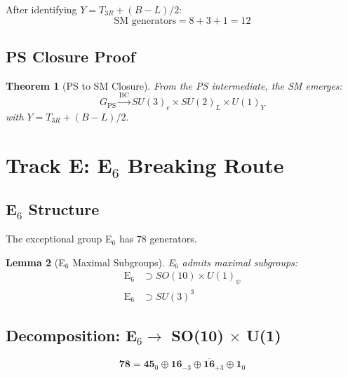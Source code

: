 \documentclass[11pt,a4paper]{article}
\newtheorem{theorem}{Theorem}[section]
\newtheorem{lemma}[theorem]{Lemma}
\begin{document}
After identifying $Y = T_{3R} + (B-L)/2$:
\begin{equation}
  \text{SM generators} = 8 + 3 + 1 = 12
  \label{eq:ps-sm-count}
\end{equation}

\subsection{PS Closure Proof}

\begin{theorem}[PS to SM Closure]
\label{thm:ps-closure}
From the PS intermediate, the SM emerges:
\begin{equation}
  G_{\text{PS}} \xrightarrow{\text{BC}} SU(3)_c \times SU(2)_L \times U(1)_Y
  \label{eq:ps-to-sm}
\end{equation}
with $Y = T_{3R} + (B-L)/2$.
\end{theorem}

\section{Track E: E$_6$ Breaking Route}
\label{sec:track-e}

\subsection{E$_6$ Structure}

The exceptional group E$_6$ has $78$ generators.

\begin{lemma}[E$_6$ Maximal Subgroups]
\label{lem:e6-subgroups}
E$_6$ admits maximal subgroups:
\begin{align}
  \text{E}_6 &\supset SO(10) \times U(1)_\psi
  \label{eq:e6-so10} \\
  \text{E}_6 &\supset SU(3)^3
  \label{eq:e6-su3cubed}
\end{align}
\end{lemma}

\subsection{Decomposition: E$_6 \to$ SO(10) $\times$ U(1)}

\begin{equation}
  \mathbf{78} = \mathbf{45}_0 \oplus \mathbf{16}_{-3} \oplus \mathbf{\overline{16}}_{+3}
    \oplus \mathbf{1}_0
  \label{eq:e6-so10-decomp}
\end{equation}
\end{document}
